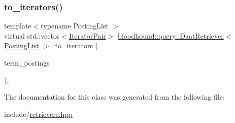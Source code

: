 \subsubsection{\texorpdfstring{to\+\_\+iterators()}{to\_iterators()}}
{\footnotesize\ttfamily template$<$typename Posting\+List $>$ \\
virtual std\+::vector$<$\hyperlink{structbloodhound_1_1query_1_1DaatRetriever_1_1IteratorPair}{Iterator\+Pair}$>$ \hyperlink{classbloodhound_1_1query_1_1DaatRetriever}{bloodhound\+::query\+::\+Daat\+Retriever}$<$ \hyperlink{classbloodhound_1_1PostingList}{Posting\+List} $>$\+::to\+\_\+iterators (\begin{DoxyParamCaption}\item[{const std\+::vector$<$ \hyperlink{classbloodhound_1_1PostingList}{Posting\+List} $>$ \&}]{term\+\_\+postings }\end{DoxyParamCaption})\hspace{0.3cm}{\ttfamily [inline]}, {\ttfamily [virtual]}}



The documentation for this class was generated from the following file\+:\begin{DoxyCompactItemize}
\item 
include/\hyperlink{retrievers_8hpp}{retrievers.\+hpp}\end{DoxyCompactItemize}
